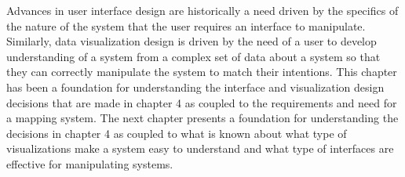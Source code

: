 Advances in user interface design are historically a need driven by the specifics of the nature of the system that the user requires an interface to manipulate. Similarly, data visualization design is driven by the need of a user to develop understanding of a system from a complex set of data about a system so that they can correctly manipulate the system to match their intentions. This chapter has been a foundation for understanding the interface and visualization design decisions that are made in chapter 4 as coupled to the requirements and need for a mapping system. The next chapter presents a foundation for understanding the decisions in chapter 4 as coupled to what is known about what type of visualizations make a system easy to understand and what type of interfaces are effective for manipulating systems.
